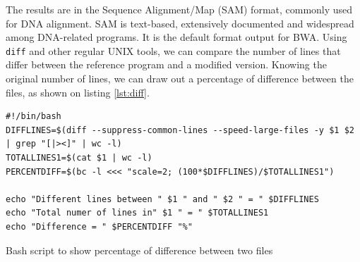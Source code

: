 The results are in the Sequence Alignment/Map (SAM) format, commonly used for DNA alignment. SAM is text-based, extensively documented\cite{samtools:sam} and widespread among DNA-related programs. It is the default format output for BWA. Using \verb|diff| and other regular UNIX tools, we can compare the number of lines that differ between the reference program and a modified version. Knowing the original number of lines, we can draw out a percentage of difference between the files, as shown on listing \ref{lst:diff}.

\begin{listing}[ht]
	\begin{verbatim}
#!/bin/bash
DIFFLINES=$(diff --suppress-common-lines --speed-large-files -y $1 $2 | grep "[|><]" | wc -l)
TOTALLINES1=$(cat $1 | wc -l)
PERCENTDIFF=$(bc -l <<< "scale=2; (100*$DIFFLINES)/$TOTALLINES1")

echo "Different lines between " $1 " and " $2 " = " $DIFFLINES
echo "Total numer of lines in" $1 " = " $TOTALLINES1
echo "Difference = " $PERCENTDIFF "%"
	\end{verbatim}
	\caption{Bash script to show percentage of difference between two files}
	\label{lst:diff}
\end{listing}

